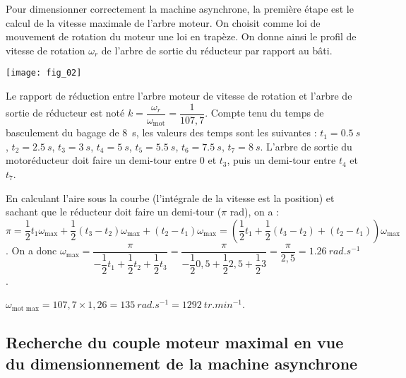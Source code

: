 \ifprof
\else
Pour dimensionner correctement la machine asynchrone, la première étape est le calcul de la vitesse maximale
de l’arbre moteur.
On choisit comme loi de mouvement de rotation du moteur une loi en trapèze. On donne ainsi le profil de vitesse de rotation $\omega_r$ de l’arbre de sortie du réducteur par rapport au bâti.

\begin{marginfigure}
\texttt{[image: fig\_02]}
\end{marginfigure}

Le rapport de réduction entre l’arbre moteur de vitesse de rotation et l’arbre de sortie de réducteur est noté $k=\dfrac{\omega_r}{\omega_{\text{mot}}} = \dfrac{1}{107,7}$.
Compte tenu du temps de basculement du bagage de \SI{8}{s}, les valeurs des temps sont les suivantes : $t_1=\SI{0,5}{s}$, $t_2=\SI{2,5}{s}$, $t_3=\SI{3}{s}$, $t_4=\SI{5}{s}$, $t_5=\SI{5,5}{s}$, $t_6=\SI{7,5}{s}$, $t_7=\SI{8}{s}$. L’arbre de sortie du motoréducteur doit faire un demi-tour entre 0 et $t_3$, puis un demi-tour entre $t_4$ et $t_7$.

\fi

\ifprof
\begin{corrige}
En calculant l'aire sous la courbe (l'intégrale de la vitesse est la position) et sachant que le réducteur doit faire un demi-tour ($\pi$ rad), on a : 
$\pi = \dfrac{1}{2}t_1 \omega_{\text{max}} +\dfrac{1}{2}\left( t_3 - t_2\right) \omega_{\text{max}} + \left( t_2 - t_1\right)\omega_{\text{max}}= \left(\dfrac{1}{2}t_1  +\dfrac{1}{2}\left( t_3 - t_2\right)  + \left( t_2 - t_1\right)\right)\omega_{\text{max}} $.  On a donc $\omega_{\text{max}}  = \dfrac{\pi}{ -\dfrac{1}{2}t_1 +\dfrac{1}{2}t_2 +  \dfrac{1}{2}t_3  }=\dfrac{\pi}{ -\dfrac{1}{2}0,5 +\dfrac{1}{2}2,5  +\dfrac{1}{2} 3 }=\dfrac{\pi}{2,5}=\SI{1,26}{rad.s^{-1}}$.
\end{corrige}
\else
\fi



\ifprof
\begin{corrige}
$\omega_{\text{mot max}}=107,7\times 1,26 = \SI{135}{rad.s^{-1}}=\SI{1292}{tr.min^{-1}}$.
\end{corrige}
\else
\fi

\subsection*{Recherche du couple moteur maximal en vue du dimensionnement de la machine asynchrone}

